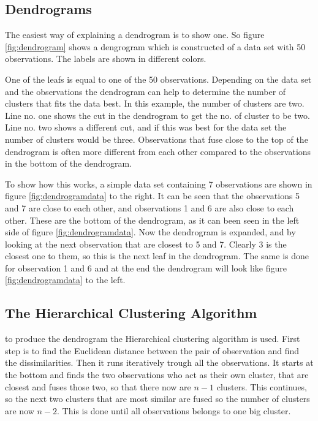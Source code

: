 \subsection{Dendrograms}
The easiest way of explaining a dendrogram is to show one. So figure \ref{fig:dendrogram} shows a dengrogram which is constructed of a data set with 50 observations.
The labels are shown in different colors.

One of the leafs is equal to one of the 50 observations. 
Depending on the data set and the observations the dendrogram can help to determine the number of clusters that fits the data best. In this example, the number of clusters are two. Line no. one shows the cut in the dendrogram to get the no. of cluster to be two. Line no. two shows a different cut, and if this was best for the data set the number of clusters would be three.
Observations that fuse close to the top of the dendrogram is often more different from each other compared to the observations in the bottom of the dendrogram. 


\FloatBarrier
To show how this works, a simple data set containing 7 observations are shown in figure \ref{fig:dendrogramdata} to the right.
It can be seen that the observations 5 and 7 are close to each other, and observations 1 and 6 are also close to each other. These are the bottom of the dendrogram, as it can been seen in the left side of figure \ref{fig:dendrogramdata}. Now the dendrogram is expanded, and by looking at the next observation that are closest to 5 and 7. Clearly 3 is the closest one to them, so this is the next leaf in the dendrogram. The same is done for observation 1 and 6 and at the end the dendrogram will look like figure \ref{fig:dendrogramdata} to the left.


\FloatBarrier
\subsection{The Hierarchical Clustering Algorithm}
to produce the dendrogram the Hierarchical clustering algorithm is used. First step is to find the Euclidean distance between the pair of observation and find the dissimilarities.
Then it runs iteratively trough all the observations. It starts at the bottom and finds the two observations who act as their own cluster, that are closest and fuses those two, so that there now are $n-1$ clusters. This continues, so the next two clusters that are most similar are fused so the number of clusters are now $n-2$. This is done until all observations belongs to one big cluster.

